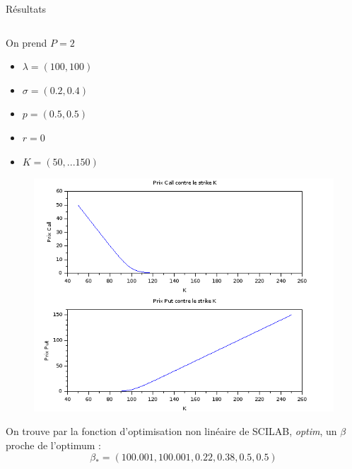 \documentclass[final]{beamer}
\newlength{\onecolwid}
\newlength{\twocolwid}
\begin{document}
\begin{frame}[t]
\begin{columns}[t]
\begin{column}{\twocolwid}
\begin{block}{Résultats}
\begin{columns}[t,totalwidth=0.45\paperwidth]
\begin{column}{\onecolwid} %


\begin{minipage}{0.49\textwidth}
  On prend $P = 2$
  \begin{itemize}
    \item $\lambda = (100,100)$
    \item $\sigma = (0.2, 0.4)$
    \item $p = (0.5,0.5) $
    \item $r = 0$
    \item $K = (50,...150)$
  \end{itemize}
\end{minipage}

\begin{minipage}{1.49\textwidth}
\begin{figure}[!r]
  \vspace{-11cm}
  \hspace{-4cm}
  \includegraphics[scale=0.85]{callput.png}
\end{figure}
\end{minipage}

On trouve par la fonction d'optimisation non linéaire de SCILAB, \textit{optim}, un $\beta$ proche de l'optimum :
$$ \beta_* = (100.001,100.001,0.22,0.38,0.5,0.5) $$


\end{column}
\end{columns}
\end{block}
\end{column}
\end{columns}
\end{frame}
\end{document}
